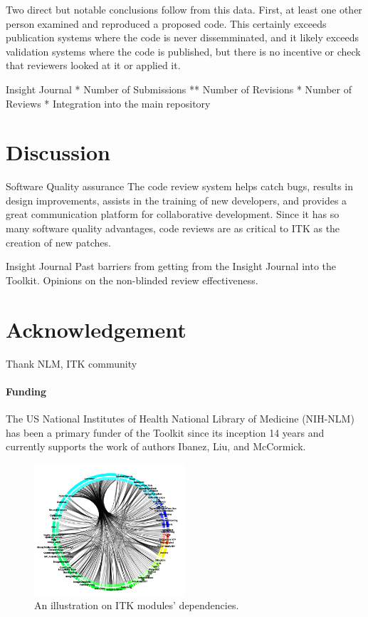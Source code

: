 \documentclass{frontiersENG} %
\begin{document}
\begin{enumeruate}
Two direct but notable conclusions follow from this data. First, at least one
other person examined and reproduced a proposed code.  This certainly exceeds
publication systems where the code is never dissemminated, and it likely
exceeds validation systems where the code is published, but there is no
incentive or check that reviewers looked at it or applied it.


Insight Journal
* Number of Submissions
** Number of Revisions
* Number of Reviews
* Integration into the main repository


\section{Discussion}
Software Quality assurance
The code review system helps catch bugs, results in design improvements, assists in the training of new developers, and provides a great communication platform for collaborative development. Since it has so many software quality advantages, code reviews are as critical to ITK as the creation of new patches.


Insight Journal
Past barriers from getting from the Insight Journal into the Toolkit.  Opinions on the
non-blinded review effectiveness.



\section*{Acknowledgement}
Thank NLM, ITK community


\paragraph{Funding\textcolon} The US National Institutes of Health National Library of Medicine (NIH-NLM) has been a primary funder of the Toolkit since its inception 14 years and currently supports the work of authors Ibanez, Liu, and McCormick.




\begin{figure}
  \centering
    \includegraphics[width=0.5\textwidth]{itk_module_dependency.png}
    \caption{An illustration on ITK modules' dependencies.}
    \label{fig:itk_module_dependency}
\end{figure}


\end{enumeruate}
\end{document}

